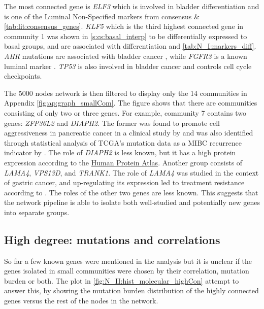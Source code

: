 The most connected gene is \textit{ELF3} which is involved in bladder differentiation and is one of the Luminal Non-Specified markers from consensus \citep{Kamoun2020-tj} \& \cref{tab:lit:consensus_genes}. \textit{KLF5} which is the third highest connected gene in community 1 was shown in \cref{s:cs:basal_interp} to be differentially expressed to basal groups, and are associated with differentiation \citep{Bell2011-xj} and \cref{tab:N_I:markers_diff}. \textit{AHR} mutations are associated with bladder cancer \citep{Shi2020-km}, while \textit{FGFR3} is a known luminal marker \citep{Robertson2017-mg}. \textit{TP53} is also involved in bladder cancer \citep{Robertson2017-mg} and controls cell cycle checkpoints.


The 5000 nodes network is then filtered to display only the 14 communities in Appendix \cref{fig:ap:graph_smallCom}. The figure shows that there are communities consisting of only two or three genes. For example, community 7 contains two genes: \textit{ZFP36L2} and \textit{DIAPH2}. The former was found to promote cell aggressiveness in pancreatic cancer in a clinical study by \citet{Yonemori2017-ky} and was also identified through statistical analysis of TCGA's mutation data as a MIBC recurrence indicator by \citet{Han2019-ma}. The role of \textit{DIAPH2} is less known, but it has a high protein expression according to the \href{https://www.proteinatlas.org/ENSG00000147202-DIAPH2/tissue}{Human Protein Atlas}. Another group consists of \textit{LAMA4}, \textit{VPS13D}, and \textit{TRANK1}. The role of \textit{LAMA4} was studied in the context of gastric cancer, and up-regulating its expression led to treatment resistance according to \citet{Peng2020-xe}. The roles of the other two genes are less known. This suggests that the network pipeline is able to isolate both well-studied and potentially new genes into separate groups.


\subsection{High degree: mutations and correlations} \label{s:N_II:corr_mut_burden}

So far a few known genes were mentioned in the analysis but it is unclear if the genes isolated in small communities were chosen by their correlation, mutation burden or both. The plot in \cref{fig:N_II:hist_molecular_highCon} attempt to answer this, by showing the mutation burden distribution of the highly connected genes versus the rest of the nodes in the network.

